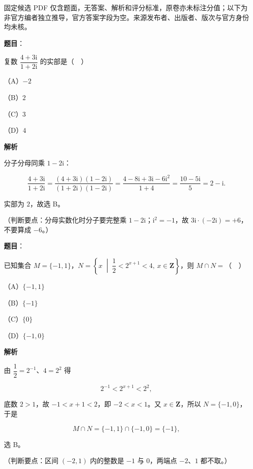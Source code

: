 

\begin{gktip}
固定候选 PDF 仅含题面，无答案、解析和评分标准，原卷亦未标注分值；以下为非官方编者独立推导，官方答案字段为空。来源发布者、出版者、版次与官方身份均未核。
\end{gktip}

\begin{answer}

\textbf{题目}：

复数 $\dfrac{4+3\mathrm i}{1+2\mathrm i}$ 的实部是（　）

（A）$-2$

（B）$2$

（C）$3$

（D）$4$

\textbf{解析}

分子分母同乘 $1-2\mathrm i$：

\nopagebreak[4]
\[\frac{4+3\mathrm i}{1+2\mathrm i}=\frac{(4+3\mathrm i)(1-2\mathrm i)}{(1+2\mathrm i)(1-2\mathrm i)}=\frac{4-8\mathrm i+3\mathrm i-6\mathrm i^2}{1+4}=\frac{10-5\mathrm i}{5}=2-\mathrm i.\]

实部为 $2$，故选 B。

（判断要点：分母实数化时分子要完整乘 $1-2\mathrm i$；$\mathrm i^2=-1$，故 $3\mathrm i\cdot(-2\mathrm i)=+6$，不要算成 $-6$。）


\end{answer}
\begin{answer}

\textbf{题目}：

已知集合 $M=\{-1,1\}$，$N=\left\{x\;\middle|\;\dfrac12<2^{x+1}<4,\ x\in\mathbf Z\right\}$，则 $M\cap N=$（　）

（A）$\{-1,1\}$

（B）$\{-1\}$

（C）$\{0\}$

（D）$\{-1,0\}$

\textbf{解析}

由 $\dfrac12=2^{-1}$、$4=2^2$ 得

\nopagebreak[4]
\[2^{-1}<2^{x+1}<2^2,\]

底数 $2>1$，故 $-1<x+1<2$，即 $-2<x<1$。又 $x\in\mathbf Z$，所以 $N=\{-1,0\}$，于是

\nopagebreak[4]
\[M\cap N=\{-1,1\}\cap\{-1,0\}=\{-1\},\]

选 B。

（判断要点：区间 $(-2,1)$ 内的整数是 $-1$ 与 $0$，两端点 $-2$、$1$ 都不取。）


\end{answer}
